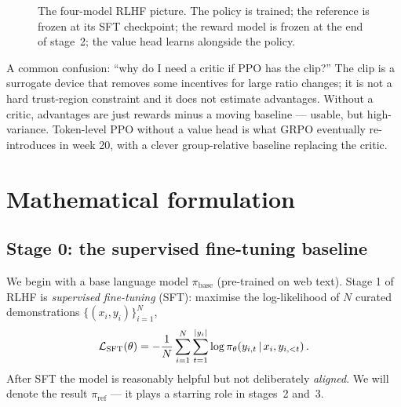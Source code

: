 \documentclass[11pt,oneside]{scrbook}
\begin{document}
\begin{figure}[ht]
\centering
{}
\caption{The four-model RLHF picture. The policy is trained; the
reference is frozen at its SFT checkpoint; the reward model is frozen
at the end of stage~2; the value head learns alongside the policy.}
\label{fig:fourmodels}
\end{figure}

\begin{pitfall}
A common confusion: ``why do I need a critic if PPO has the clip?''
The clip is a surrogate device that removes some incentives for large ratio changes; it is not a hard trust-region constraint and it does not
estimate advantages. Without a critic, advantages are just rewards
minus a moving baseline --- usable, but high-variance. Token-level
PPO without a value head is what GRPO eventually re-introduces in
week 20, with a clever group-relative baseline replacing the critic.
\end{pitfall}

\chapter{Mathematical formulation}

\section{Stage 0: the supervised fine-tuning baseline}

We begin with a base language model $\pi_{\text{base}}$ (pre-trained
on web text). Stage 1 of RLHF is \emph{supervised fine-tuning} (SFT):
maximise the log-likelihood of $N$ curated demonstrations
$\{(x_i, y_i)\}_{i=1}^N$,
\begin{equation}
\mathcal{L}_{\text{SFT}}(\theta)
  = -\frac{1}{N} \sum_{i=1}^N \sum_{t=1}^{|y_i|}
      \log \pi_\theta\!\left(y_{i,t} \,\vert\, x_i, y_{i,<t}\right).
\label{eq:sft}
\end{equation}
After SFT the model is reasonably helpful but not deliberately
\emph{aligned}. We will denote the result $\pi_{\text{ref}}$ --- it
plays a starring role in stages~2 and~3.
\end{document}
